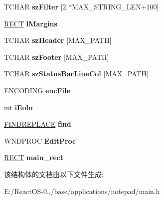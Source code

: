 \begin{DoxyCompactItemize}
T\+C\+H\+AR {\bfseries sz\+Filter} \mbox{[}2 $\ast$M\+A\+X\+\_\+\+S\+T\+R\+I\+N\+G\+\_\+\+L\+EN+100\mbox{]}
\item 
\mbox{\label{struct_n_o_t_e_p_a_d___g_l_o_b_a_l_s_a9f33aaae4a436b9427bc88f4ad18c049}} 
\hyperlink{structtag_r_e_c_t}{R\+E\+CT} {\bfseries l\+Margins}
\item 
\mbox{\label{struct_n_o_t_e_p_a_d___g_l_o_b_a_l_s_a47af4a19cf30998805645e6cd3b72923}} 
T\+C\+H\+AR {\bfseries sz\+Header} \mbox{[}M\+A\+X\+\_\+\+P\+A\+TH\mbox{]}
\item 
\mbox{\label{struct_n_o_t_e_p_a_d___g_l_o_b_a_l_s_a8bd9ce579f3fc6e7c62f7249638360fe}} 
T\+C\+H\+AR {\bfseries sz\+Footer} \mbox{[}M\+A\+X\+\_\+\+P\+A\+TH\mbox{]}
\item 
\mbox{\label{struct_n_o_t_e_p_a_d___g_l_o_b_a_l_s_a293ae2417a9ed4a811bc24635c4fab1e}} 
T\+C\+H\+AR {\bfseries sz\+Status\+Bar\+Line\+Col} \mbox{[}M\+A\+X\+\_\+\+P\+A\+TH\mbox{]}
\item 
\mbox{\label{struct_n_o_t_e_p_a_d___g_l_o_b_a_l_s_a5bcffb9d0073d0aeedaa10ccb2a4a207}} 
E\+N\+C\+O\+D\+I\+NG {\bfseries enc\+File}
\item 
\mbox{\label{struct_n_o_t_e_p_a_d___g_l_o_b_a_l_s_aca696577151e4589ccddd5eb77f2a522}} 
int {\bfseries i\+Eoln}
\item 
\mbox{\label{struct_n_o_t_e_p_a_d___g_l_o_b_a_l_s_a99d3b694cb31940ce46070e17c0b6411}} 
\hyperlink{struct_f_i_n_d_r_e_p_l_a_c_e_a}{F\+I\+N\+D\+R\+E\+P\+L\+A\+CE} {\bfseries find}
\item 
\mbox{\label{struct_n_o_t_e_p_a_d___g_l_o_b_a_l_s_a6bf0a634ac609a4003421f622bcfff9f}} 
W\+N\+D\+P\+R\+OC {\bfseries Edit\+Proc}
\item 
\mbox{\label{struct_n_o_t_e_p_a_d___g_l_o_b_a_l_s_ae2c0ca83678abf7095e5e9d70e4f64b1}} 
\hyperlink{structtag_r_e_c_t}{R\+E\+CT} {\bfseries main\+\_\+rect}
\end{DoxyCompactItemize}


该结构体的文档由以下文件生成\+:\begin{DoxyCompactItemize}
\item 
E\+:/\+React\+O\+S-\/0../base/applications/notepad/main.\+h\end{DoxyCompactItemize}

